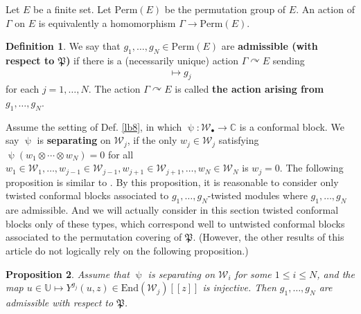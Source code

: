 \documentclass[12pt,a4paper,notitlepage]{article}
\theoremstyle{definition}
\newtheorem{df}{Definition}[subsection]
\theoremstyle{plain}
\newtheorem{pp}[df]{Proposition}
\newcommand{\fk}{\mathfrak}
\newcommand{\mc}{\mathcal}
\newcommand{\End}{\mathrm{End}} %
\newcommand{\blt}{\bullet}
\newcommand{\Ubb}{\mathbb U}
\newcommand{\Cbb}{\mathbb C}
\newcommand{\Perm}{\mathrm{Perm}}
\numberwithin{equation}{subsection}
\begin{document}
Let $E$ be a finite set. Let $\Perm(E)$ be the permutation group of $E$. \index{ESE@$E,\Perm(E)$} An action of $\Gamma$ on $E$ is equivalently a homomorphism $\Gamma\rightarrow\Perm(E)$. 

\begin{df}\label{lb61}
We say that $g_1,\dots,g_N\in\Perm(E)$ are \textbf{admissible (with respect to $\fk P$)}  if there is a (necessarily unique) action $\Gamma\curvearrowright E$ sending
\begin{align}
	[\upalpha_j]\mapsto g_j	\label{eq2}
\end{align}
for each $j=1,\dots, N$. The action $\Gamma\curvearrowright E$ is called \textbf{the action arising from $g_1,\dots,g_N$}.
\end{df}



Assume the setting of Def. \ref{lb8}, in which $\uppsi:\mc W_\blt\rightarrow\Cbb$ is a conformal block. We say $\uppsi$ is \textbf{separating} on $\mc W_j$, if the only $w_j\in\mc W_j$ satisfying $\uppsi(w_1\otimes\cdots\otimes w_N)=0$ for all $w_1\in\mc W_1,\dots,w_{j-1}\in\mc W_{j-1},w_{j+1}\in\mc W_{j+1},\dots,w_N\in\mc W_N$ is $w_j=0$. The following proposition is similar to \cite[Thm. 4.7]{Hua18}. By this proposition, it is reasonable to consider only twisted conformal blocks associated to $g_1,\dots,g_N$-twisted modules where $g_1,\dots,g_N$ are admissible. And we will actually consider in this section  twisted conformal blocks only of these types, which correspond well to untwisted conformal blocks associated to the permutation covering of $\fk P$. (However, the other results of this article do not logically rely on the following proposition.)

\begin{pp}
Assume that $\uppsi$ is separating on $\mc W_i$ for some $1\leq i\leq N$, and the map $u\in\Ubb\mapsto Y^{g_j}(u,z)\in\End(\mc W_j)[[z]]$ is injective. Then $g_1,\dots,g_N$ are admissible with respect to $\fk P$.
\end{pp}
\end{document}
